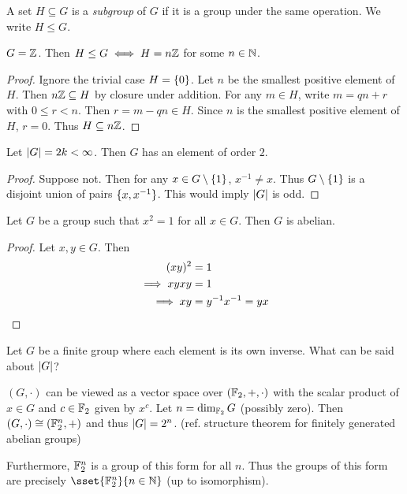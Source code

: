 \begin{definition}[subgroup] \label{def:group:sub}
    A set $H \subseteq G$ is a \emph{subgroup} of $G$ if it is a group
    under the same operation.
    We write $H \le G$.
\end{definition}
\begin{examples}
    \item $G = \mathbb{Z}$. Then $H \le G \iff H = n\mathbb{Z}$ for some $n \in \mathbb{N}$.
    \begin{proof}
        Ignore the trivial case $H = \{0\}$.
        Let $n$ be the smallest positive element of $H$.
        Then $n\mathbb{Z} \subseteq H$ by closure under addition.
        For any $m \in H$, write $m = qn + r$ with $0 \le r < n$.
        Then $r = m - qn \in H$.
        Since $n$ is the smallest positive element of $H$, $r = 0$.
        Thus $H \subseteq n\mathbb{Z}$.
    \end{proof}
    \item Let $\lvert G\rvert = 2k < \infty$.
    Then $G$ has an element of order $2$.
    \begin{proof}
        Suppose not.
        Then for any $x \in G \setminus \{1\}$, $x^{-1} \ne x$.
        Thus $G \setminus \{1\}$ is a disjoint union of pairs
        $\{x, x^{-1}\}$.
        This would imply $\lvert G\rvert$ is odd.
    \end{proof}
    \item Let $G$ be a group such that $x^2 = 1$ for all $x \in G$.
    Then $G$ is abelian.
    \begin{proof}
        Let $x, y \in G$.
        Then \begin{align*}
            (xy)^2 &= 1 \\
            \implies xyxy &= 1 \\
            \implies xy &= y^{-1} x^{-1} = yx \qedhere
        \end{align*}
    \end{proof}
    \item Let $G$ be a finite group where each element is its own inverse.
    What can be said about $\lvert G\rvert$?

    $(G, \cdot)$ can be viewed as a vector space over $(\mathbb{F}_2, +, \cdot)$
    with the scalar product of $x \in G$ and $c \in \mathbb{F}_2$ given by
    $x^c$.
    Let $n = \dim_{\mathbb{F}_2} G$ (possibly zero).
    Then $(G, \cdot) \cong (\mathbb{F}_2^n, +)$ and thus $\lvert G\rvert = 2^n$.
    (ref. structure theorem for finitely generated abelian groups)

    Furthermore, $\mathbb{F}_2^n$ is a group of this form for all $n$.
    Thus the groups of this form are precisely $\sset{\F_2^n}{n \in \N}$
    (up to isomorphism).
\end{examples}

